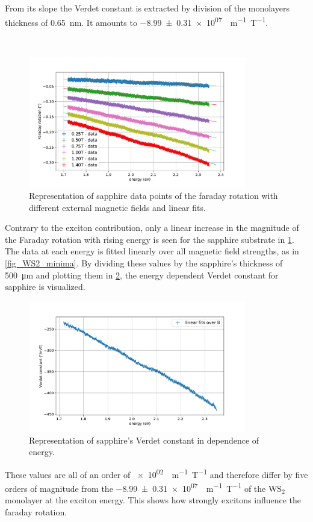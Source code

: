 From its slope the Verdet constant is extracted by division of the monolayers thickness of \SI{0.65}{\nano\meter}.
It amounts to \SI{-8.99+-0.31e+07}{\deg m^{-1} T^{-1}}.

\

\begin{figure}[!ht]
    \centering
    \includegraphics[width=0.85\textwidth]{plots/sapphire_lins.pdf}
    \caption{Representation of sapphire data points of the faraday rotation with different external magnetic fields and linear fits.}
    \label{fig_sapphire_lins}
\end{figure}
Contrary to the exciton contribution, only a linear increase in the magnitude of the Faraday rotation with rising energy is seen for the sapphire substrate in \cref{fig_sapphire_lins}.
The data at each energy is fitted linearly over all magnetic field strengths, as in \cref{fig_WS2_minima}.
By dividing these values by the sapphire's thickness of \SI{500}{\micro\meter} and plotting them in \cref{fig_sapphire_verdets}, the energy dependent Verdet constant for sapphire is visualized.

\begin{figure}[!ht]
    \centering
    \includegraphics[width=0.85\textwidth]{plots/sapphire_verdets.pdf}
    \caption{Representation of sapphire's Verdet constant in dependence of energy.}
    \label{fig_sapphire_verdets}
\end{figure}

These values are all of an order of \SI{e+02}{{\deg m^{-1} T^{-1}}} and therefore differ by five orders of magnitude from the \SI{-8.99+-0.31e+07}{\deg m^{-1} T^{-1}} of the WS$_2$ monolayer at the exciton energy.
This shows how strongly excitons influence the faraday rotation.
